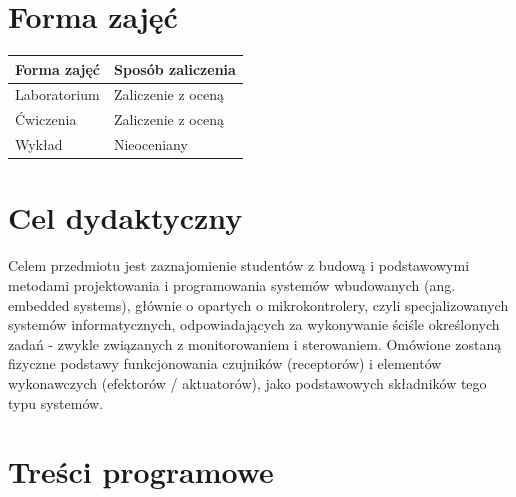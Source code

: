 \documentclass[12pt, a4paper]{article}
\begin{document}
\section{Forma zajęć}

\begin{tabular}{ll}
  \hline
  \textbf{Forma zajęć} & \textbf{Sposób zaliczenia} \\
  \hline
  Laboratorium & Zaliczenie z oceną \\
  Ćwiczenia & Zaliczenie z oceną \\
  Wykład & Nieoceniany \\
  \hline
\end{tabular}

\section{Cel dydaktyczny}

Celem przedmiotu jest zaznajomienie studentów z budową i podstawowymi metodami projektowania i programowania systemów wbudowanych (ang. embedded systems), głównie o opartych o mikrokontrolery, czyli specjalizowanych systemów informatycznych, odpowiadających za wykonywanie ściśle określonych zadań - zwykle związanych z monitorowaniem i sterowaniem. Omówione zostaną fizyczne podstawy funkcjonowania czujników (receptorów) i elementów wykonawczych (efektorów / aktuatorów), jako podstawowych składników tego typu systemów.

\section{Treści programowe}
\end{document}
